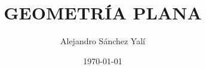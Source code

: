 

\title{GEOMETRÍA PLANA}
\author{Alejandro Sánchez Yalí}
\date{\today}


\makeglossaries



\frontmatter





\tableofcontents
\listoffigures
\listoftables

\mainmatter





\backmatter

\printbibliography

\glsaddall %
\printglossaries
\printindex


